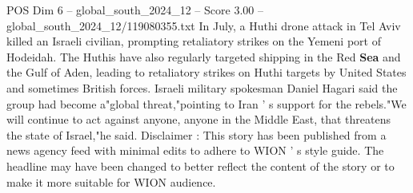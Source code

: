 \begin{textsample}{POS Dim 6 – global\_south\_2024\_12 – Score 3.00 – global\_south\_2024\_12/119080355.txt}
In July, a Huthi drone attack in Tel Aviv killed an Israeli civilian, prompting retaliatory strikes on the Yemeni port of Hodeidah.
The Huthis have also regularly targeted shipping in the Red \textbf{Sea} and the Gulf of Aden, leading to retaliatory strikes on Huthi targets by United States and sometimes British forces.
Israeli military spokesman Daniel Hagari said the group had become a"global threat,"pointing to Iran ' s support for the rebels."We will continue to act against anyone, anyone in the Middle East, that threatens the state of Israel,"he said.
Disclaimer : This story has been published from a news agency feed with minimal edits to adhere to WION ' s style guide.
The headline may have been changed to better reflect the content of the story or to make it more suitable for WION audience.

\end{textsample}
